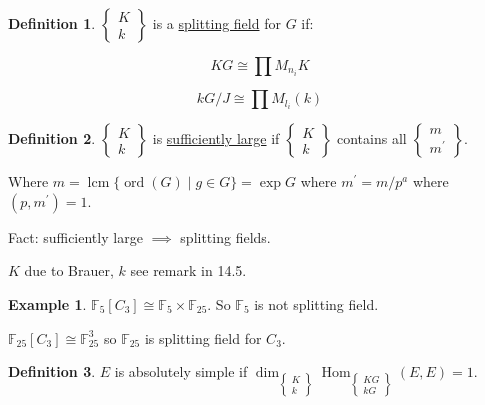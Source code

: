 \documentclass{article}
\theoremstyle{definition}
\newtheorem*{example}{Example}
\newtheorem*{definition}{Definition}
\begin{document}
\begin{definition}
    \(\begin{Bmatrix}
        K \\ k
    \end{Bmatrix}\) is a \underline{splitting field} for \(G\) if:

    \[
        KG \cong \prod M_{n_i} K
    \]

    \[
        kG / J \cong \prod M_{l_i} (k)
    \]
\end{definition}

\begin{definition}
    \(\begin{Bmatrix} K \\ k \end{Bmatrix}\) is \underline{sufficiently large} if \(\begin{Bmatrix} K \\ k \end{Bmatrix}\) contains all \(\begin{Bmatrix} m \\ m^{\prime} \end{Bmatrix}\).
    
    Where \(m = \operatorname{lcm}\{ \operatorname{ord}(G) \mid g\in G \} = \exp G\) where \(m^{\prime} = m / p^a\) where \((p, m^{\prime})=1\). 
\end{definition}

Fact: sufficiently large \(\implies\) splitting fields.

\(K\) due to Brauer, \(k\) see remark in 14.5.

\begin{example}
    \(\mathbb{F}_5 [C_3] \cong \mathbb{F}_5 \times \mathbb{F}_{25}\). So \(\mathbb{F}_5\) is not splitting field.

    \(\mathbb{F}_{25} [C_3] \cong \mathbb{F}_{25}^3\) so \(\mathbb{F}_{25}\) is splitting field for \(C_3\).
\end{example}

\begin{definition}
    \(E\) is absolutely simple if \(\dim_{\begin{Bmatrix} K \\ k \end{Bmatrix}} \operatorname{Hom}_{\begin{Bmatrix} KG \\ kG \end{Bmatrix}}(E,E) = 1\). 
\end{definition}
\end{document}
